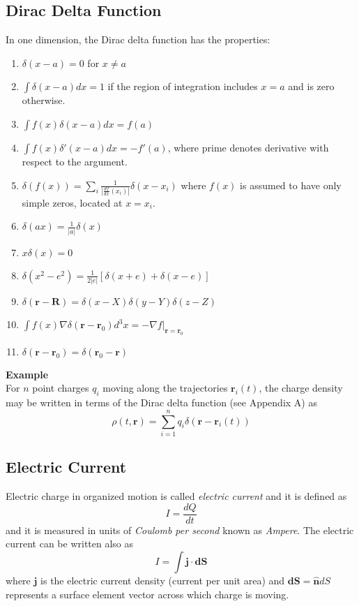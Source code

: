 \subsection{Dirac Delta Function}
In one dimension, the Dirac delta function has the properties:
\begin{enumerate}
\item $\delta(x-a) = 0 $ for $x \neq a$
\item $\int \delta(x-a) dx = 1 $ if the region of integration includes $x=a$ and is zero otherwise.
\item $\int f(x) \delta(x-a) dx = f(a)$
\item $\int f(x) \delta ' (x-a) dx = - f'(a)$, where prime denotes derivative with respect to the argument.
\item $\delta (f(x)) = \sum_i \frac{1}{\left| \frac{df}{dx} (x_i)\right|} \delta (x-x_i) $ where $f(x)$ is assumed to have only simple zeros, located at $x=x_i$.
\item $ \delta (ax) = \frac{1}{\left| a \right|} \delta (x)$
\item $x\delta(x) = 0$
\item $\delta \left( x^2 - e^2 \right) = \frac{1}{2 \left| e \right| } \left[ \delta(x+e) + \delta(x-e) \right] $

\item $\delta (\textbf{r} - \textbf{R}) = \delta(x-X) \delta(y-Y) \delta(z-Z)$
\item $\int f(x) \nabla \delta (\textbf{r} - \textbf{r}_0) d^3x = - \left. \nabla f \right|_{\textbf{r} = \textbf{r}_0} $
\item $ \delta(\textbf{r} - \textbf{r}_0) = \delta(\textbf{r}_0 - \textbf{r})$
\end{enumerate}


\textbf{Example}\\
For $n$ point charges $q_i$ moving along the trajectories $\textbf{r}_i (t)$, the charge density may be written in terms of the Dirac delta function (see Appendix A) as
\begin{equation}
\rho (t,\textbf{r}) = \sum_{i=1}^n q_i \delta\left( \textbf{r} - \textbf{r}_i (t) \right) \label{eq:nPointDensity}
\end{equation}

\subsection{Electric Current}
Electric charge in organized motion is called  \textit{electric current} and it is defined as
\begin{equation}
I = \frac{dQ}{dt}
\end{equation}
and it is measured in units of  \textit{Coulomb per second}  known as \textit{Ampere}. The electric current can be written also as
\begin{equation}
I = \int \textbf{j} \cdot \textbf{dS}
\end{equation}
where $\textbf{j}$ is the electric current density (current per unit area) and $\textbf{dS} = \hat{ \textbf{n}} dS$ represents a surface element vector across  which charge is moving.

